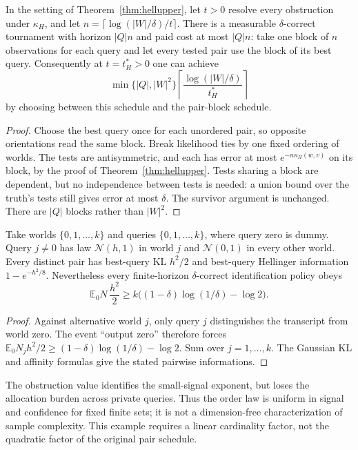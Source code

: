 \begin{theorem}
\label{thm:sharedtests}
In the setting of Theorem~\ref{thm:hellupper}, let $t>0$ resolve every obstruction under
$\kappa_H$, and let $n=\lceil\log(|W|/\delta)/t\rceil$.
There is a measurable $\delta$-correct tournament with horizon $|Q|n$ and paid cost at most
$|Q|n$: take one block of $n$ observations for each query and let every tested pair use the
block of its best query. Consequently at $t=t_H^*>0$ one can achieve
\[
\min\{|Q|,|W|^2\}\left\lceil\frac{\log(|W|/\delta)}{t_H^*}\right\rceil
\]
by choosing between this schedule and the pair-block schedule.
\end{theorem}
\begin{proof}
Choose the best query once for each unordered pair, so opposite orientations read the same
block. Break likelihood ties by one fixed ordering of worlds. The tests are antisymmetric,
and each has error at most $e^{-n\kappa_H(w,v)}$ on its block, by the proof of
Theorem~\ref{thm:hellupper}. Tests sharing a block are dependent, but no independence between
tests is needed: a union bound over the truth's tests still gives error at most $\delta$.
The survivor argument is unchanged. There are $|Q|$ blocks rather than $|W|^2$.
\end{proof}

\begin{proposition}
\label{prop:privatequery}
Take worlds $\{0,1,\ldots,k\}$ and queries $\{0,1,\ldots,k\}$, where query zero is dummy.
Query $j\ne0$ has law $\mathcal N(h,1)$ in world $j$ and $\mathcal N(0,1)$ in every other
world. Every distinct pair has best-query KL $h^2/2$ and best-query Hellinger information
$1-e^{-h^2/8}$. Nevertheless every finite-horizon $\delta$-correct identification policy obeys
\[
\mathbb E_0N\,\frac{h^2}{2}\ge
k\bigl((1-\delta)\log(1/\delta)-\log2\bigr).
\]
\end{proposition}
\begin{proof}
Against alternative world $j$, only query $j$ distinguishes the transcript from world zero.
The event ``output zero'' therefore forces
$\mathbb E_0N_j h^2/2\ge(1-\delta)\log(1/\delta)-\log2$. Sum over $j=1,\ldots,k$.
The Gaussian KL and affinity formulas give the stated pairwise informations.
\end{proof}
The obstruction value identifies the small-signal exponent, but loses the allocation burden
across private queries. Thus the order law is uniform in signal and confidence for fixed
finite sets; it is not a dimension-free characterization of sample complexity. This example
requires a linear cardinality factor, not the quadratic factor of the original pair schedule.

